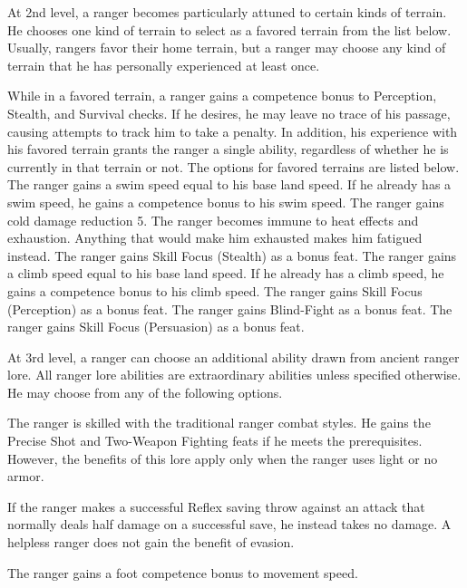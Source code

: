 At 2nd level, a ranger becomes particularly attuned to certain kinds of terrain. He chooses one kind of terrain to select as a favored terrain from the list below. Usually, rangers favor their home terrain, but a ranger may choose any kind of terrain that he has personally experienced at least once.
\par While in a favored terrain, a ranger gains a  competence bonus to Perception, Stealth, and Survival checks. If he desires, he may leave no trace of his passage, causing attempts to track him to take a  penalty. In addition, his experience with his favored terrain grants the ranger a single ability, regardless of whether he is currently in that terrain or not. The options for favored terrains are listed below.
 The ranger gains a swim speed equal to his base land speed. If he already has a swim speed, he gains a  competence bonus to his swim speed.
 The ranger gains cold damage reduction 5.
 The ranger becomes immune to heat effects and exhaustion. Anything that would make him exhausted makes him fatigued instead.
 The ranger gains Skill Focus (Stealth) as a bonus feat.
 The ranger gains a climb speed equal to his base land speed. If he already has a climb speed, he gains a  competence bonus to his climb speed.
 The ranger gains Skill Focus (Perception) as a bonus feat.
 The ranger gains Blind-Fight as a bonus feat.
 The ranger gains Skill Focus (Persuasion) as a bonus feat.

 At 3rd level, a ranger can choose an additional ability drawn from ancient ranger lore. All ranger lore abilities are extraordinary abilities unless specified otherwise.  He may choose from any of the following options.

 The ranger is skilled with the traditional ranger combat styles. He gains the Precise Shot and Two-Weapon Fighting feats if he meets the prerequisites. However, the benefits of this lore apply only when the ranger uses light or no armor.

 If the ranger makes a successful Reflex saving throw against an attack that normally deals half damage on a successful save, he instead takes no damage. A helpless ranger does not gain the benefit of evasion.

 The ranger gains a  foot competence bonus to movement speed.

